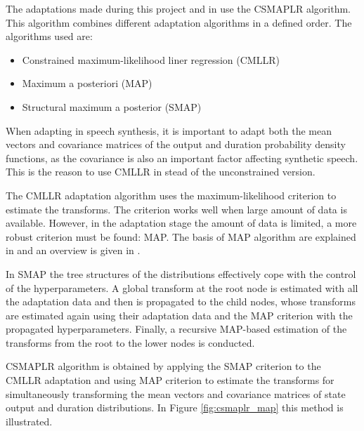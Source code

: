 The adaptations made during this project and in \cite{karhila_jstsp_14} use the CSMAPLR algorithm.
%
This algorithm combines different adaptation algorithms in a defined order. The algorithms used are:

\begin{itemize}
	\item Constrained maximum-likelihood liner regression (CMLLR)
	\item Maximum a posteriori (MAP)
	\item Structural maximum a posterior (SMAP)
\end{itemize}

When adapting in speech synthesis, it is important to adapt both the mean vectors and covariance matrices of the output and duration probability density functions, as the covariance is also an important factor affecting synthetic speech.
%
This is the reason to use CMLLR in stead of the unconstrained version.

The CMLLR adaptation algorithm uses the maximum-likelihood criterion \cite{digalakis1995speaker, gales1998maximum} to estimate the transforms. 
%
The criterion works well when large amount of data is available.
%
However, in the adaptation stage the amount of data is limited, a more robust criterion must be found: MAP.
%
The basis of MAP algorithm are explained in \cite{gauvain1994maximum} and an overview is given in \cite{yamagishi2009}.

In SMAP \cite{shinoda2001structural} the tree structures of the distributions effectively cope with the control of the hyperparameters.
%
A global transform at the root node is estimated with all the adaptation data and then is propagated to the child nodes, whose transforms are estimated again using their adaptation data and the MAP criterion with the propagated hyperparameters.
%
Finally, a recursive MAP-based estimation of the transforms from the root to the lower nodes is conducted.

CSMAPLR algorithm is obtained by applying the SMAP criterion to the CMLLR adaptation and using MAP criterion to estimate the transforms for simultaneously transforming the mean vectors and covariance matrices of state output and duration distributions.
%
In Figure \ref{fig:csmaplr_map} this method is illustrated.

